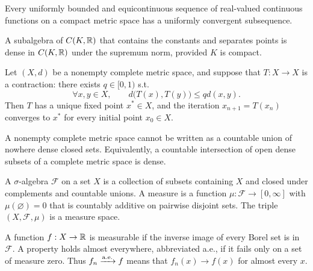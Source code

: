     \begin{theorem}
        Every uniformly bounded and equicontinuous sequence of real-valued
        continuous functions on a compact metric space has a uniformly
        convergent subsequence.
    \end{theorem}

    \begin{theorem}
        A subalgebra of $C(K,\mathbb{R})$ that contains the constants and separates
        points is dense in $C(K,\mathbb{R})$ under the supremum norm, provided $K$ is
        compact.
    \end{theorem}

    \begin{theorem}
        Let $(X,d)$ be a nonempty complete metric space, and suppose that
        $T:X\to X$ is a contraction: there exists $q\in[0,1)$ s.t.
        \[
            \forall x,y\in X,
            \qquad
            d\bigl(T(x),T(y)\bigr)\leq qd(x,y).
        \]
        Then $T$ has a unique fixed point $x^\ast\in X$, and the iteration
        $x_{n+1}=T(x_n)$ converges to $x^\ast$ for every initial point $x_0\in X$.
    \end{theorem}

    \begin{theorem}
        A nonempty complete metric space cannot be written as a countable union
        of nowhere dense closed sets. Equivalently, a countable intersection of
        open dense subsets of a complete metric space is dense.
    \end{theorem}

    \begin{definition}
        A $\sigma$-algebra $\mathcal{F}$ on a set $X$ is a collection of subsets
        containing $X$ and closed under complements and countable unions. A
        measure is a function $\mu:\mathcal{F}\to[0,\infty]$ with
        $\mu(\varnothing)=0$ that is countably additive on pairwise disjoint
        sets. The triple $(X,\mathcal{F},\mu)$ is a measure space.

        A function $f:X\to\mathbb{R}$ is measurable if the inverse image of every Borel
        set is in $\mathcal{F}$. A property holds almost everywhere, abbreviated
        a.e., if it fails only on a set of measure zero. Thus $f_n\xrightarrow{\mathrm{a.e.}} f$ means
        that $f_n(x)\to f(x)$ for almost every $x$.
    \end{definition}

